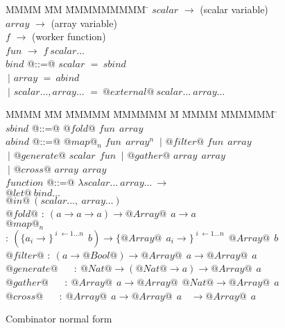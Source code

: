 \begin{figure}
\begin{tabbing}
MMMM        \= MM \= MMMMMMMMM \= \kill
$scalar$    \> $\to$ \> (scalar variable) \\
$array$     \> $\to$ \> (array variable)  \\
$f$         \> $\to$ \> (worker function) \\
$fun$       \> $\to$ \> $f~scalar\ldots$
\\[2ex]
$bind$      \> @::=@ \> $scalar$ \> $=~sbind$ \\
            \> $~|$  \> $array$  \> $=~abind$ \\
            \> $~|$  \> $scalar\ldots,array\ldots$ \> $=~@external@~scalar\ldots~array\ldots$
\end{tabbing}

\begin{tabbing}
MMMM        \= MM \= MMMMM \= MMMMMM \= M \= MMMM \= MMMMMM \= \kill
$sbind$     \> @::=@ \> $@fold@$     \> $fun~~ array$
\\[1ex]

$abind$     \> @::=@ \> $@map@_n$    \> $fun~~ array^n$ 
            \> $~|$  \> $@filter@$   \> $fun~~ array$   \\
            \> $~|$  \> $@generate@$ \> $scalar~~ fun$  
            \> $~|$  \> $@gather@$   \> $array~~ array$ \\
            \> $~|$  \> $@cross@$    \> $array~~ array$
\\[1ex]
$function$  \> @::=@ \> $\lambda scalar\ldots~array\ldots~\to$ \\
            \>          \> $@let@~bind\ldots$                  \\
            \>          \> $@in@~(scalar\ldots,~array\ldots)$
\\[3ex]
$@fold@$     \> $:~ (a \to a \to a) \to @Array@~~ a \to a$     \\
$@map@_n$    \> $:~ (\{a_i          \to\}^{\;i\; \gets 1 \dots n}~~ b)  \to
                       \{@Array@~~ a_i \to\}^{\;i\; \gets 1 \dots n}~~ @Array@~~ b$ \\
$@filter@$   \> $:~ (a \to @Bool@) \to @Array@~~ a \to @Array@~~ a$      \\
$@generate@$ \> ~~ $:~ @Nat@ \to (@Nat@ \to a) \to @Array@~~ a$          \\
$@gather@$   \> ~~ $:~ @Array@~~ a \to @Array@~~ @Nat@  \to @Array@~~ a$ \\
$@cross@$    \> ~~ $:~ @Array@~~ a \to @Array@~~ a ~~~~ \to @Array@~~ a$
\end{tabbing}
\caption{Combinator normal form}
\label{f:CombinatorNormalForm}
\end{figure}

